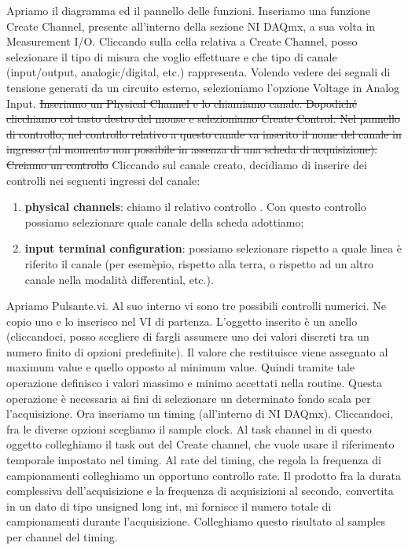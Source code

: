 Apriamo il diagramma ed il pannello delle funzioni. Inseriamo una funzione Create Channel, presente all'interno della sezione NI DAQmx, a sua volta in Measurement I/O.
Cliccando sulla cella relativa a Create Channel, posso selezionare il tipo di misura che voglio effettuare e che tipo di canale (input/output, analogic/digital, etc.) rappresenta. Volendo vedere dei segnali di tensione generati da un circuito esterno, selezioniamo l'opzione Voltage in  Analog Input.
\sout{Inseriamo un Physical Channel e lo chiamiamo canale. Dopodiché clicchiamo col tasto destro del mouse e selezioniamo Create Control. Nel pannello di controllo, nel controllo relativo a questo canale va inserito il nome del canale in ingresso (al momento non possibile in assenza di una scheda di acquisizione).
Creiamo un controllo}
Cliccando sul canale creato, decidiamo di inserire dei controlli nei seguenti ingressi del canale:
\begin{enumerate}
    \item \textbf{physical channels}: chiamo il relativo controllo . Con questo controllo possiamo selezionare quale canale della scheda adottiamo;
    \item \textbf{input terminal configuration}: possiamo selezionare rispetto a quale linea è riferito il canale (per esemèpio, rispetto alla terra, o rispetto ad un altro canale nella modalità differential, etc.).
\end{enumerate}
Apriamo Pulsante.vi. Al suo interno vi sono tre possibili controlli numerici. Ne copio uno e lo inserisco nel VI di partenza. L'oggetto inserito è un anello (cliccandoci, posso scegliere di fargli assumere uno dei valori discreti tra un numero finito di opzioni predefinite). Il valore che restituisce viene assegnato al maximum value e quello opposto al minimum value. Quindi tramite tale operazione definisco i valori massimo e minimo accettati nella routine. Questa operazione è necessaria ai fini di selezionare un determinato fondo scala per l'acquisizione.
Ora inseriamo un timing (all'interno di NI DAQmx). Cliccandoci, fra le diverse opzioni scegliamo il sample clock. Al task channel in di questo oggetto colleghiamo il task out del Create channel, che vuole usare il riferimento temporale impostato nel timing. Al rate del timing, che regola la frequenza di campionamenti colleghiamo un opportuno controllo rate.
Il prodotto fra la durata complessiva dell'acquisizione e la frequenza di acquisizioni al secondo, convertita in un dato di tipo unsigned long int, mi fornisce il numero totale di campionamenti durante l'acquisizione. Colleghiamo questo risultato al samples per channel del timing.
